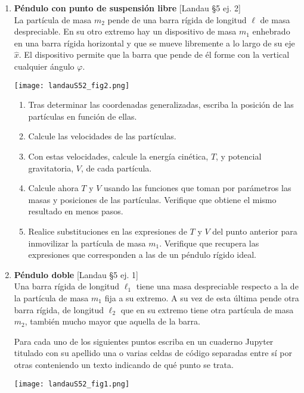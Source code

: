 \documentclass[11pt, spanish, a4paper, twoside]{article}
\begin{document}
\begin{enumerate}
\item
	\begin{minipage}[t][2.5cm]{0.7\textwidth}
		\textbf{Péndulo con punto de suspensión libre} [Landau \S5 ej. 2]\\
		La partícula de masa \(m_2\) pende de una barra rígida de longitud \(\ell\) de masa despreciable.
		En su otro extremo hay un dispositivo de masa \(m_1\) enhebrado en una barra rígida horizontal y que se mueve libremente a lo largo de su eje \(\hat{x}\).
		El dispositivo permite que la barra que pende de él forme con la vertical cualquier ángulo \(\varphi\). 
	\end{minipage}
	\begin{minipage}[c][2cm][t]{0.3\textwidth}
		\texttt{[image: landauS52\_fig2.png]}
	\end{minipage}
	\begin{enumerate}
		\item Tras determinar las coordenadas generalizadas, escriba la posición de las partículas en función de ellas.
		\item Calcule las velocidades de las partículas.
		\item Con estas velocidades, calcule la energía cinética, \(T\), y potencial gravitatoria, \(V\), de cada partícula.  
		\item Calcule ahora \(T\) y \(V\) usando las funciones que toman por parámetros las masas y posiciones de las partículas. Verifique que obtiene el mismo resultado en menos pasos.
		\item Realice substituciones en las expresiones de \(T\) y \(V\) del punto anterior para inmovilizar la partícula de masa \(m_1\). Verifique que recupera las expresiones que corresponden a las de un péndulo rígido ideal.
	\end{enumerate}



\item
	\begin{minipage}[t][3.7cm]{0.7\textwidth}
		\textbf{Péndulo doble} [Landau \S5 ej. 1]\\
		Una barra rígida de longitud \(\ell_1\) tiene una masa despreciable respecto a la de la partícula de masa \(m_1\) fija a su extremo.
		A su vez de esta última pende otra barra rígida, de longitud \(\ell_2\) que en su extremo tiene otra partícula de masa \(m_2\), también mucho mayor que aquella de la barra.
	
		Para cada uno de los siguientes puntos escriba en un cuaderno Jupyter titulado con su apellido una o varias celdas de código separadas entre sí por otras conteniendo un texto indicando de qué punto se trata.
	\end{minipage}
	\begin{minipage}[c][2cm][t]{0.3\textwidth}
		\texttt{[image: landauS52\_fig1.png]}
	\end{minipage}


\end{enumerate}
\end{document}
